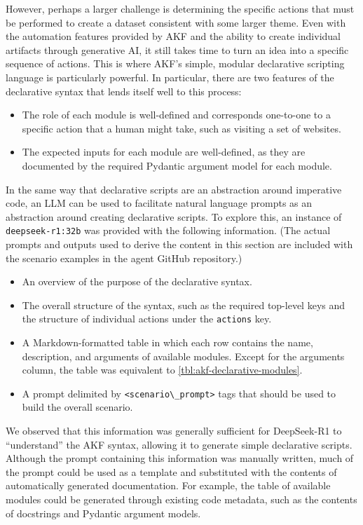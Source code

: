\documentclass[final,5p,times,twocolumn]{elsarticle}
\newcommand{\passthrough}[1]{#1}
\begin{document}
However, perhaps a larger challenge is determining the specific actions
that must be performed to create a dataset consistent with some larger
theme. Even with the automation features provided by AKF and the ability
to create individual artifacts through generative AI, it still takes
time to turn an idea into a specific sequence of actions. This is where
AKF's simple, modular declarative scripting language is particularly
powerful. In particular, there are two features of the declarative
syntax that lends itself well to this process:

\begin{itemize}
\item
  The role of each module is well-defined and corresponds one-to-one to
  a specific action that a human might take, such as visiting a set of
  websites.
\item
  The expected inputs for each module are well-defined, as they are
  documented by the required Pydantic argument model for each module.
\end{itemize}

In the same way that declarative scripts are an abstraction around
imperative code, an LLM can be used to facilitate natural language
prompts as an abstraction around creating declarative scripts. To
explore this, an instance of \passthrough{\lstinline!deepseek-r1:32b!}
was provided with the following information. (The actual prompts and
outputs used to derive the content in this section are included with the
scenario examples in the agent GitHub repository.)

\begin{itemize}
\item
  An overview of the purpose of the declarative syntax.
\item
  The overall structure of the syntax, such as the required top-level
  keys and the structure of individual actions under the
  \passthrough{\lstinline!actions!} key.
\item
  A Markdown-formatted table in which each row contains the name,
  description, and arguments of available modules. Except for the
  arguments column, the table was equivalent to
  \autoref{tbl:akf-declarative-modules}.
\item
  A prompt delimited by \passthrough{\lstinline!<scenario\_prompt>!}
  tags that should be used to build the overall scenario.
\end{itemize}

We observed that this information was generally sufficient for
DeepSeek-R1 to ``understand'' the AKF syntax, allowing it to generate
simple declarative scripts. Although the prompt containing this
information was manually written, much of the prompt could be used as a
template and substituted with the contents of automatically generated
documentation. For example, the table of available modules could be
generated through existing code metadata, such as the contents of
docstrings and Pydantic argument models.
\end{document}
